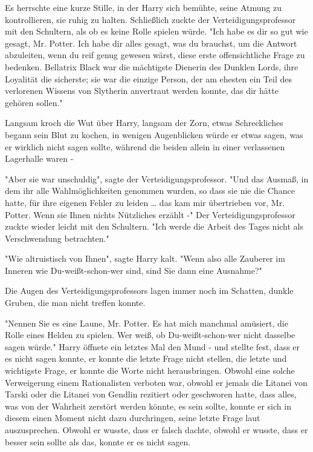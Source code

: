 {Es herrschte eine kurze Stille, in der Harry sich bemühte, seine Atmung zu kontrollieren, sie ruhig zu halten. Schließlich zuckte der Verteidigungsprofessor mit den Schultern, als ob es keine Rolle spielen würde. "Ich habe es dir so gut wie gesagt, Mr. Potter. Ich habe dir alles gesagt, was du brauchst, um die Antwort abzuleiten, wenn du reif genug gewesen wärst, diese erste offensichtliche Frage zu bedenken. Bellatrix Black war die mächtigste Dienerin des Dunklen Lords, ihre Loyalität die sicherste; sie war die einzige Person, der am ehesten ein Teil des verlorenen Wissens von Slytherin anvertraut werden konnte, das dir hätte gehören sollen."

Langsam kroch die Wut über Harry, langsam der Zorn, etwas Schreckliches begann sein Blut zu kochen, in wenigen Augenblicken würde er etwas sagen, was er wirklich nicht sagen sollte, während die beiden allein in einer verlassenen Lagerhalle waren -

"Aber sie war unschuldig", sagte der Verteidigungsprofessor. "Und das Ausmaß, in dem ihr alle Wahlmöglichkeiten genommen wurden, so dass sie nie die Chance hatte, für ihre eigenen Fehler zu leiden … das kam mir übertrieben vor, Mr. Potter. Wenn sie Ihnen nichts Nützliches erzählt -" Der Verteidigungsprofessor zuckte wieder leicht mit den Schultern. "Ich werde die Arbeit des Tages nicht als Verschwendung betrachten."

"Wie altruistisch von Ihnen", sagte Harry kalt. "Wenn also alle Zauberer im Inneren wie Du-weißt-schon-wer sind, sind Sie dann eine Ausnahme?"

Die Augen des Verteidigungsprofessors lagen immer noch im Schatten, dunkle Gruben, die man nicht treffen konnte.

"Nennen Sie es eine Laune, Mr. Potter. Es hat mich manchmal amüsiert, die Rolle eines Helden zu spielen. Wer weiß, ob Du-weißt-schon-wer nicht dasselbe sagen würde." Harry öffnete ein letztes Mal den Mund - und stellte fest, dass er es nicht sagen konnte, er konnte die letzte Frage nicht stellen, die letzte und wichtigste Frage, er konnte die Worte nicht herausbringen. Obwohl eine solche Verweigerung einem Rationalisten verboten war, obwohl er jemals die Litanei von Tarski oder die Litanei von Gendlin rezitiert oder geschworen hatte, dass alles, was von der Wahrheit zerstört werden könnte, es sein sollte, konnte er sich in diesem einen Moment nicht dazu durchringen, seine letzte Frage laut auszusprechen. Obwohl er wusste, dass er falsch dachte, obwohl er wusste, dass er besser sein sollte als das, konnte er es nicht sagen.

}
